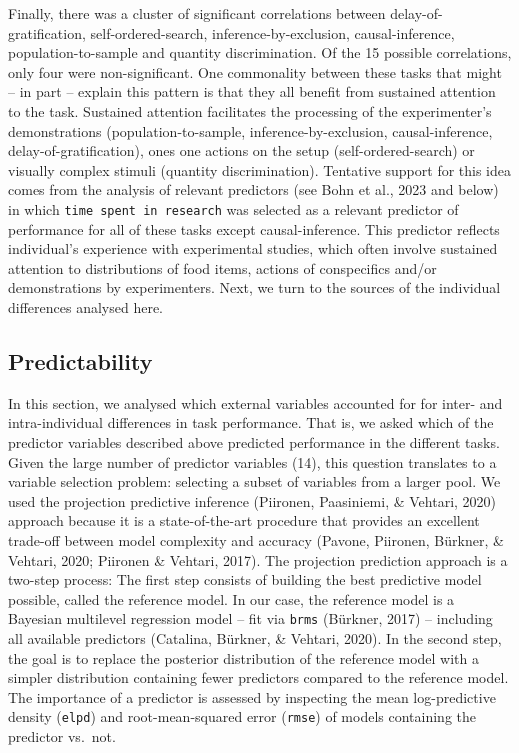 \documentclass[
  man,floatsintext]{apa6}
\begin{document}
Finally, there was a cluster of significant correlations between delay-of-gratification, self-ordered-search, inference-by-exclusion, causal-inference, population-to-sample and quantity discrimination. Of the 15 possible correlations, only four were non-significant. One commonality between these tasks that might -- in part -- explain this pattern is that they all benefit from sustained attention to the task. Sustained attention facilitates the processing of the experimenter's demonstrations (population-to-sample, inference-by-exclusion, causal-inference, delay-of-gratification), ones one actions on the setup (self-ordered-search) or visually complex stimuli (quantity discrimination). Tentative support for this idea comes from the analysis of relevant predictors (see Bohn et al., 2023 and below) in which \texttt{time\ spent\ in\ research} was selected as a relevant predictor of performance for all of these tasks except causal-inference. This predictor reflects individual's experience with experimental studies, which often involve sustained attention to distributions of food items, actions of conspecifics and/or demonstrations by experimenters. Next, we turn to the sources of the individual differences analysed here.

\hypertarget{predictability}{%
\subsection{Predictability}\label{predictability}}

In this section, we analysed which external variables accounted for for inter- and intra-individual differences in task performance. That is, we asked which of the predictor variables described above predicted performance in the different tasks. Given the large number of predictor variables (14), this question translates to a variable selection problem: selecting a subset of variables from a larger pool. We used the projection predictive inference (Piironen, Paasiniemi, \& Vehtari, 2020) approach because it is a state-of-the-art procedure that provides an excellent trade-off between model complexity and accuracy (Pavone, Piironen, Bürkner, \& Vehtari, 2020; Piironen \& Vehtari, 2017). The projection prediction approach is a two-step process: The first step consists of building the best predictive model possible, called the reference model. In our case, the reference model is a Bayesian multilevel regression model -- fit via \texttt{brms} (Bürkner, 2017) -- including all available predictors (Catalina, Bürkner, \& Vehtari, 2020). In the second step, the goal is to replace the posterior distribution of the reference model with a simpler distribution containing fewer predictors compared to the reference model. The importance of a predictor is assessed by inspecting the mean log-predictive density (\texttt{elpd}) and root-mean-squared error (\texttt{rmse}) of models containing the predictor vs.~not.
\end{document}
